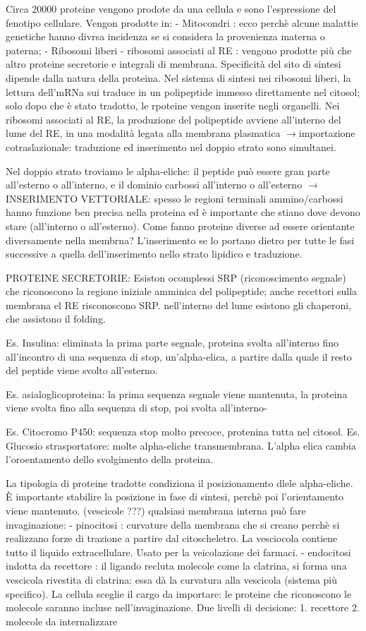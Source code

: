 \documentclass[a4paper,12pt]{article}
\newcommand{\lfreccia}{\ensuremath{\longrightarrow}}
\begin{document}
Circa 20000 proteine vengono prodote da una cellula e sono l'espressione del fenotipo cellulare. Vengon prodotte in:
- Mitocondri : ecco perchè alcune malattie genetiche hanno divrsa incidenza se si considera la provenienza materna o paterna;
- Ribosomi liberi
- ribosomi associati al RE : vengono prodotte più che altro proteine secretorie e integrali di membrana.
Specificità del sito di sintesi dipende dalla natura della proteina.
Nel sistema di sintesi nei ribosomi liberi, la lettura dell'mRNa sui traduce in un polipeptide immesso direttamente nel citosol; solo dopo che è stato tradotto, le rpoteine vengon inserite negli organelli.
Nei ribosomi associati al RE, la produzione del polipeptide avviene all'interno del lume del RE, in una modalità legata alla membrana plasmatica \lfreccia importazione cotraslazionale: traduzione ed inserimento nel doppio strato sono simultanei.

Nel doppio strato troviamo le alpha-eliche: il peptide può essere gran parte all'esterno o all'interno, e il dominio carbossi all'interno o all'esterno \lfreccia INSERIMENTO VETTORIALE: spesso le regioni terminali ammino/carbossi hanno funzione ben precisa nella proteina ed è importante che stiano dove devono stare (all'interno o all'esterno).
Come fanno proteine diverse ad essere orientante diversamente nella membrna?
L'inserimento se lo portano dietro per tutte le fasi successive a quella dell'inserimento nello strato lipidico e traduzione.

PROTEINE SECRETORIE: 
Esiston ocomplessi SRP (riconoscimento segnale) che riconoscono la regione iniziale amminica del polipeptide; anche recettori sulla membrana el RE risconoscono SRP.
nell'interno del lume esistono gli chaperoni, che assistono il folding.

Es. Insulina: eliminata la prima parte segnale, proteina svolta all'interno fino all'incontro di una sequenza di stop, un'alpha-elica, a partire dalla quale il resto del peptide viene svolto all'esterno.

Es. asialoglicoproteina: la prima sequenza segnale viene mantenuta, la proteina viene svolta fino alla sequenza di stop, poi svolta all'interno-

Es. Citocromo P450: sequenza stop molto precoce, protenina tutta nel citosol.
Es. Glucosio strasportatore: molte alpha-eliche transmembrana. L'alpha elica cambia l'oroentamento dello svolgimento della proteina.

La tipologia di proteine tradotte condiziona il posizionamento dlele alpha-eliche. È importante stabilire la posizione in fase di sintesi, perchè poi l'orientamento viene mantenuto. (vescicole ???)
qualsiasi membrana interna può fare invaginazione:
- pinocitosi : curvature della membrana che si creano perchè si realizzano forze di trazione a partire dal citoscheletro. La vesciocola contiene tutto il liquido extracellulare. Usato per la veicolazione dei farmaci.
- endocitosi indotta da recettore : il ligando recluta molecole come la clatrina, si forma una vescicola rivestita di clatrina: essa dà la curvatura alla vescicola (sistema più specifico). La cellula sceglie il cargo da importare: le proteine che riconoscono le molecole saranno incluse nell'invaginazione. Due livelli di decisione:
1. recettore
2. molecole da internalizzare
\end{document}
